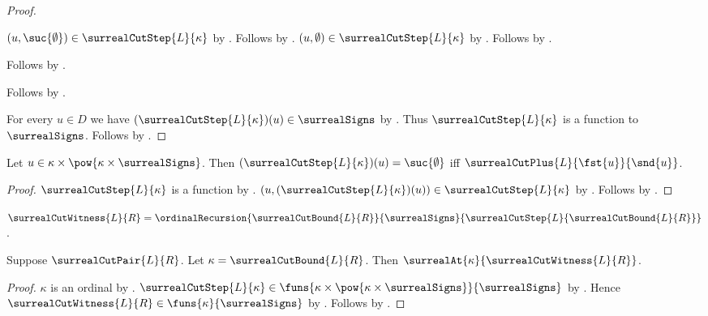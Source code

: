 \begin{proof}
\begin{subproof}
\begin{subproof}
\begin{subproof}
\begin{byCase}
                        $(u,\suc{\emptyset})\in
                            \surrealCutStep{L}{\kappa}$
                            by .
                        Follows by .
                        $(u,\emptyset)\in
                            \surrealCutStep{L}{\kappa}$
                            by .
                        Follows by .
                \end{byCase}
            \end{subproof}
            Follows by .
        \end{subproof}
        Follows by .
    \end{subproof}
    For every $u\in D$ we have
        $(\surrealCutStep{L}{\kappa})(u)\in\surrealSigns$
        by .
    Thus $\surrealCutStep{L}{\kappa}$ is a function to
        $\surrealSigns$.
    Follows by .
\end{proof}

\begin{proposition}\label{surreal_cut_step_positive}
    Let $u\in\kappa\times\pow{\kappa\times\surrealSigns}$.
    Then
    $(\surrealCutStep{L}{\kappa})(u)=\suc{\emptyset}$ iff
        $\surrealCutPlus{L}{\fst{u}}{\snd{u}}$.
\end{proposition}
\begin{proof}
    $\surrealCutStep{L}{\kappa}$ is a function
        by .
    $(u,(\surrealCutStep{L}{\kappa})(u))\in
        \surrealCutStep{L}{\kappa}$
        by .
    Follows by
        .
\end{proof}

\begin{definition}\label{surreal_cut_witness}
    $\surrealCutWitness{L}{R}=
        \ordinalRecursion{\surrealCutBound{L}{R}}{\surrealSigns}
            {\surrealCutStep{L}{\surrealCutBound{L}{R}}}$.
\end{definition}

\begin{proposition}\label{surreal_cut_witness_at}
    Suppose $\surrealCutPair{L}{R}$.
    Let $\kappa=\surrealCutBound{L}{R}$.
    Then $\surrealAt{\kappa}{\surrealCutWitness{L}{R}}$.
\end{proposition}
\begin{proof}
    $\kappa$ is an ordinal by .
    $\surrealCutStep{L}{\kappa}\in
        \funs{\kappa\times\pow{\kappa\times\surrealSigns}}
            {\surrealSigns}$
        by .
    Hence $\surrealCutWitness{L}{R}\in
        \funs{\kappa}{\surrealSigns}$
        by .
    Follows by .
\end{proof}


